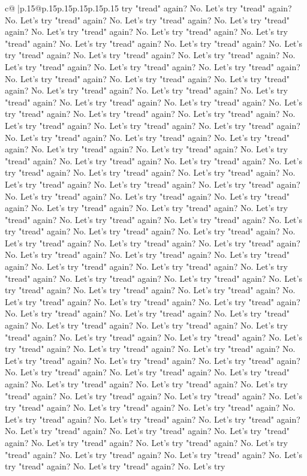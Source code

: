 \documentclass{article}
\begin{document}
{\begin{supertabular}{c@{$\;$}|p{.15\linewidth}@{}p{.15\linewidth}p{.15\linewidth}p{.15\linewidth}p{.15\linewidth}p{.15\linewidth}}
{{{try "tread" again? No. Let's try "tread" again? No. Let's try "tread" again? No. Let's try "tread" again? No. Let's try "tread" again? No. Let's try "tread" again? No. Let's try "tread" again? No. Let's try "tread" again? No. Let's try "tread" again? No. Let's try "tread" again? No. Let's try "tread" again? No. Let's try "tread" again? No. Let's try "tread" again? No. Let's try "tread" again? No. Let's try "tread" again? No. Let's try "tread" again? No. Let's try "tread" again? No. Let's try "tread" again? No. Let's try "tread" again? No. Let's try "tread" again? No. Let's try "tread" again? No. Let's try "tread" again? No. Let's try "tread" again? No. Let's try "tread" again? No. Let's try "tread" again? No. Let's try "tread" again? No. Let's try "tread" again? No. Let's try "tread" again? No. Let's try "tread" again? No. Let's try "tread" again? No. Let's try "tread" again? No. Let's try "tread" again? No. Let's try "tread" again? No. Let's try "tread" again? No. Let's try "tread" again? No. Let's try "tread" again? No. Let's try "tread" again? No. Let's try "tread" again? No. Let's try "tread" again? No. Let's try "tread" again? No. Let's try "tread" again? No. Let's try "tread" again? No. Let's try "tread" again? No. Let's try "tread" again? No. Let's try "tread" again? No. Let's try "tread" again? No. Let's try "tread" again? No. Let's try "tread" again? No. Let's try "tread" again? No. Let's try "tread" again? No. Let's try "tread" again? No. Let's try "tread" again? No. Let's try "tread" again? No. Let's try "tread" again? No. Let's try "tread" again? No. Let's try "tread" again? No. Let's try "tread" again? No. Let's try "tread" again? No. Let's try "tread" again? No. Let's try "tread" again? No. Let's try "tread" again? No. Let's try "tread" again? No. Let's try "tread" again? No. Let's try "tread" again? No. Let's try "tread" again? No. Let's try "tread" again? No. Let's try "tread" again? No. Let's try "tread" again? No. Let's try "tread" again? No. Let's try "tread" again? No. Let's try "tread" again? No. Let's try "tread" again? No. Let's try "tread" again? No. Let's try "tread" again? No. Let's try "tread" again? No. Let's try "tread" again? No. Let's try "tread" again? No. Let's try "tread" again? No. Let's try "tread" again? No. Let's try "tread" again? No. Let's try "tread" again? No. Let's try "tread" again? No. Let's try "tread" again? No. Let's try "tread" again? No. Let's try "tread" again? No. Let's try "tread" again? No. Let's try "tread" again? No. Let's try "tread" again? No. Let's try "tread" again? No. Let's try "tread" again? No. Let's try "tread" again? No. Let's try "tread" again? No. Let's try "tread" again? No. Let's try "tread" again? No. Let's try "tread" again? No. Let's try "tread" again? No. Let's try "tread" again? No. Let's try "tread" again? No. Let's try "tread" again? No. Let's try "tread" again? No. Let's try "tread" again? No. Let's try "tread" again? No. Let's try "tread" again? No. Let's try "tread" again? No. Let's try "tread" again? No. Let's try "tread" again? No. Let's try "tread" again? No. Let's try "tread" again? No. Let's try "tread" again? No. Let's try "tread" again? No. Let's try }}}
\end{supertabular}}
\end{document}
